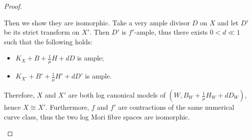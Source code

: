 \begin{proof}
\begin{enumerate}
          Then we show they are isomorphic. Take a very ample divisor $ D $ on $ X $ and let $ D'  $ be its strict transform on $ X' $. Then $ D' $ is $ f' $-ample, thus there exists $ 0<d\ll1 $ such that the following holds:
          \begin{itemize}
            \item $ K_X+B+\frac{1}{\mu }H+dD $ is ample;
            \item $ K_{X'}+B'+\frac{1}{\mu }H'+dD' $ is ample.
          \end{itemize}
          Therefore, $X$ and $X'$ are both log canonical models of $(W,B_{W}+\frac{1}{\mu}H_{W}+dD_{W})$, hence $X\cong X'$. Furthermore, $f$ and  $f'$ are contractions of the same numerical curve class, thus the two log Mori fibre spaces are isomorphic.
  \end{enumerate}
\end{proof}

